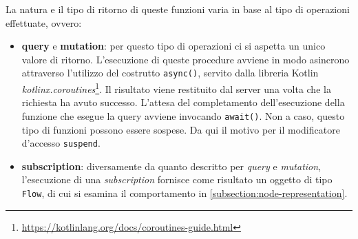 \newpage La natura e il tipo di ritorno di queste funzioni varia in base al tipo di operazioni effettuate, ovvero:
\begin{itemize}
	\item \textbf{query} e \textbf{mutation}: per questo tipo di operazioni ci si aspetta un unico valore di ritorno. L'esecuzione di queste procedure avviene in modo asincrono attraverso l'utilizzo del costrutto \texttt{async()}, servito dalla libreria Kotlin \textit{kotlinx.coroutines}\footnote{\url{https://kotlinlang.org/docs/coroutines-guide.html}}. Il risultato viene restituito dal server una volta che la richiesta ha avuto successo. L'attesa del completamento dell'esecuzione della funzione che esegue la query avviene invocando \texttt{await()}. Non a caso, questo tipo di funzioni possono essere sospese. Da qui il motivo per il modificatore d'accesso \texttt{suspend}.
	\item \textbf{subscription}: diversamente da quanto descritto per \textit{query} e \textit{mutation}, l'esecuzione di una \textit{subscription} fornisce come risultato un oggetto di tipo \texttt{Flow}, di cui si esamina il comportamento in \cref{subsection:node-representation}.
\end{itemize}

